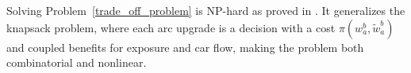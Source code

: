 \documentclass[letterpaper, 10 pt, conference]{ieeeconf}  %
\begin{document}
Solving Problem~\ref{trade_off_problem} is $\text{NP}$-hard as proved in \cite{jurado2025graph}. It generalizes the knapsack problem, where each arc upgrade is a decision with a cost $\pi(w_{a}^{b},\tilde{w}_{a}^{b})$ and coupled benefits for exposure and car flow, making the problem both combinatorial and nonlinear.











\end{document}
